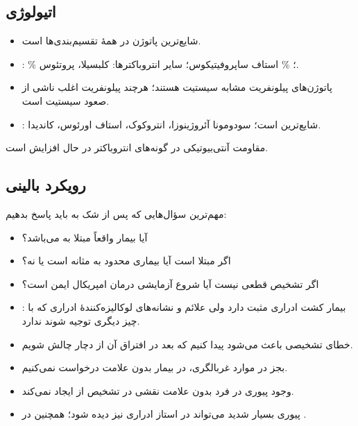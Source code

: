\subsection*{اتیولوژی }
\begin{itemize}
\item {} شایع‌ترین پاتوژن در همهٔ تقسیم‌بندی‌ها است.
\item {}: \% ؛ \% استاف ساپروفیتیکوس؛ سایر انتروباکترها: کلبسیلا، پروتئوس.
\item پاتوژن‌های پیلونفریت مشابه سیستیت هستند؛ هرچند پیلونفریت اغلب ناشی از صعود سیستیت است.
\item {}:  شایع‌ترین است؛ سودومونا آئروژینوزا، انتروکوک، استاف اورئوس، کاندیدا.
\end{itemize}

مقاومت آنتی‌بیوتیکی در گونه‌های انتروباکتر در حال افزایش است.

\subsection*{رویکرد بالینی}
مهم‌ترین سؤال‌هایی که پس از شک به  باید پاسخ بدهیم:
\begin{itemize}
\item آیا بیمار واقعاً مبتلا به  می‌باشد؟
\item اگر مبتلا است آیا بیماری محدود به مثانه است یا نه؟
\item اگر تشخیص قطعی نیست آیا شروع آزمایشی درمان  امپریکال ایمن است؟
\end{itemize}

\begin{itemize}
\item {}: بیمار کشت ادراری مثبت دارد ولی علائم و نشانه‌های لوکالیزه‌کنندهٔ ادراری که با چیز دیگری توجیه شوند ندارد.
\item خطای تشخیصی باعث می‌شود  پیدا کنیم که بعد در افتراق آن از  دچار چالش شویم.
\item بجز در موارد غربالگری، در بیمار بدون علامت  درخواست نمی‌کنیم.
\item وجود پیوری در فرد بدون علامت نقشی در تشخیص  از  ایجاد نمی‌کند.
\item پیوری بسیار شدید می‌تواند در استاز ادراری نیز دیده شود؛ همچنین در .
\end{itemize}

